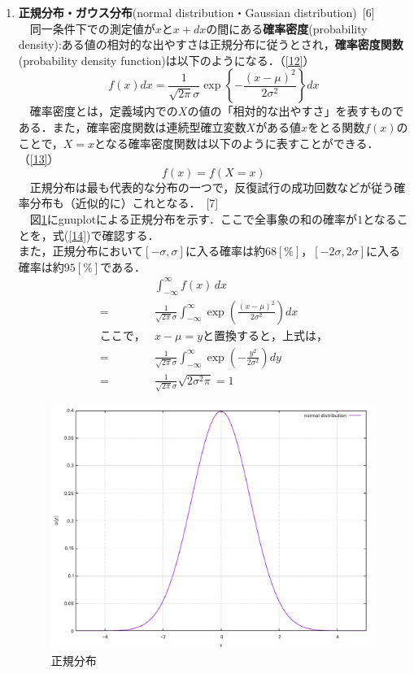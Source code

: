 \documentclass[fleqn,dvipdfmx]{jarticle}
\begin{document}
\begin{enumerate}
\item \textbf{正規分布・ガウス分布}(normal distribution・Gaussian distribution)~[6]\\
　同一条件下での測定値が$x$と$x+dx$の間にある\textbf{確率密度}(probability density):ある値の相対的な出やすさは正規分布に従うとされ，\textbf{確率密度関数}(probability density function)は以下のようになる．（\ref{12}）
	\begin{equation}
	\label{12}
	f(x)dx=\frac{1}{\sqrt{2\pi}\sigma} \exp \left\{-\frac{(x-\mu)^2}{2\sigma^2}\right\}dx
	\end{equation}
　確率密度とは，定義域内での$X$の値の「相対的な出やすさ」を表すものである．また，確率密度関数は連続型確立変数$X$がある値$x$をとる関数$f(x)$のことで，$X=x$となる確率密度関数は以下のように表すことができる．（\ref{13}）\\
\begin{equation}
\label{13}
f(x)=f(X=x)
\end{equation}
　正規分布は最も代表的な分布の一つで，反復試行の成功回数などが従う確率分布も（近似的に）これとなる．~[7]\\
　図\ref{plot1}にgnuplotによる正規分布を示す．ここで全事象の和の確率が$1$となることを，式(\ref{14})で確認する．\\
また，正規分布において$[-\sigma,\sigma]$に入る確率は約$68[\%]$，$[-2\sigma,2\sigma]$に入る確率は約$95[\%]$である．
\begin{align}
\label{14}
&\int_{-\infty}^{\infty} f(x)\,dx\nonumber\\
=&\frac{1}{\sqrt{2\pi}\sigma} \int_{-\infty}^{\infty} \exp \left(\frac{(x-\mu)^{2}}{2\sigma^{2}}\right)dx\nonumber\\
ここで，&x-\mu=yと置換すると，上式は，\nonumber\\
=&\frac{1}{\sqrt{2\pi}\sigma } \int_{-\infty}^{\infty} \exp \left(-\frac{y^{2}}{2\sigma^{2}}\right)dy\nonumber\\
=&\frac{1}{\sqrt{2\pi}\sigma }\sqrt{2\sigma^{2}\pi}=1
\end{align}
\begin{figure}[htbp]
\centering
\includegraphics[scale=0.8]{./plot.pdf}
\caption{正規分布}
\label{plot1}
\end{figure}
\end{enumerate}
\end{document}
